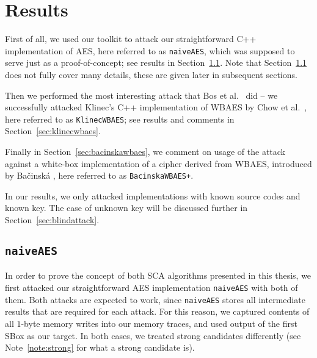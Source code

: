 \section{Results}
\label{sec:results}

First of all, we used our toolkit to attack our straightforward C++ implementation of AES, here referred to as {\tt naiveAES}, which was supposed to serve just as a proof-of-concept; see results in Section~\ref{sec:naiveaes}. Note that Section~\ref{sec:naiveaes} does not fully cover many details, these are given later in subsequent sections.

Then we performed the most interesting attack that Bos et al.\ \cite{bos2015differential} did -- we successfully attacked Klinec's C++ implementation \cite{klinec2013implementation} of WBAES by Chow et al.\ \cite{chow2002aes}, here referred to as {\tt KlinecWBAES}; see results and comments in Section~\ref{sec:klinecwbaes}.

Finally in Section~\ref{sec:bacinskawbaes}, we comment on usage of the attack against a white-box implementation of a cipher derived from WBAES, introduced by Bačinská \cite{bacinska2015white}, here referred to as {\tt BacinskaWBAES+}.

\begin{note}
\label{note:expdes}
	In our results, we only attacked implementations with known source codes and known key. The case of unknown key will be discussed further in Section~\ref{sec:blindattack}.
\end{note}



\subsection{\tt naiveAES}
\label{sec:naiveaes}

In order to prove the concept of both SCA algorithms presented in this thesis, we first attacked our straightforward AES implementation {\tt naiveAES} with both of them. Both attacks are expected to work, since {\tt naiveAES} stores all intermediate results that are required for each attack. For this reason, we captured contents of all $1$-byte memory writes into our memory traces, and used output of the first SBox as our target. In both cases, we treated strong candidates differently (see Note~\ref{note:strong} for what a strong candidate is).

